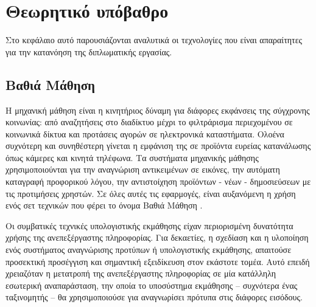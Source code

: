 \chapter{Θεωρητικό υπόβαθρο}

Στο κεφάλαιο αυτό παρουσιάζονται αναλυτικά οι τεχνολογίες που είναι απαραίτητες για την κατανόηση της διπλωματικής εργασίας.

\section{Βαθιά Μάθηση}

Η μηχανική μάθηση είναι η κινητήριος δύναμη για διάφορες εκφάνσεις της σύγχρονης κοινωνίας: από αναζητήσεις στο διαδίκτυο μέχρι το φιλτράρισμα περιεχομένου σε κοινωνικά δίκτυα και προτάσεις αγορών σε ηλεκτρονικά καταστήματα. 
Ολοένα συχνότερη και συνηθέστερη γίνεται η εμφάνιση της σε προϊόντα ευρείας κατανάλωσης όπως κάμερες και κινητά τηλέφωνα. 
Τα συστήματα μηχανικής μάθησης χρησιμοποιούνται για την αναγνώριση αντικειμένων σε εικόνες, την αυτόματη καταγραφή προφορικού λόγου, την αντιστοίχηση προϊόντων - νέων - δημοσιεύσεων με τις προτιμήσεις χρηστών. 
Σε όλες αυτές τις εφαρμογές, είναι αυξανόμενη η χρήση ενός σετ τεχνικών που φέρει το όνομα Βαθιά Μάθηση  \cite{LeCun2015}.

Οι συμβατικές τεχνικές υπολογιστικής εκμάθησης είχαν περιορισμένη δυνατότητα χρήσης της ανεπεξέργαστης πληροφορίας. 
Για δεκαετίες, η σχεδίαση και η υλοποίηση ενός συστήματος αναγνώρισης προτύπων ή υπολογιστικής εκμάθησης, απαιτούσε προσεκτική προσέγγιση και σημαντική εξειδίκευση στον εκάστοτε τομέα. 
Αυτό επειδή χρειαζόταν η μετατροπή της ανεπεξέργαστης πληροφορίας σε μία κατάλληλη εσωτερική αναπαράσταση, την οποία το υποσύστημα εκμάθησης -- συχνότερα ένας ταξινομητής -- θα χρησιμοποιούσε για αναγνωρίσει πρότυπα στις διάφορες εισόδους.

